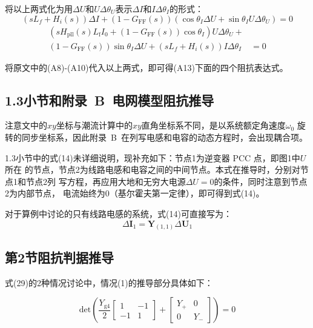 \documentclass[12pt, a4paper, UTF8, fontset=adobe, scheme=chinese, heading=true, oneside]{ctexbook} %
\begin{document}
将以上两式化为用$\Delta U$和$U\Delta\theta_U$表示$\Delta I$和$I\Delta\theta_I$的形式：
\begin{equation}
  (sL_f+H_i(s))\Delta I + (1-G_{\mathrm{FF}}(s))(\cos\theta_I\Delta U + \sin\theta_I U\Delta\theta_U) = 0
\end{equation}
\begin{equation}
\begin{split}
  \left(s H_{\mathrm{pll}}(s)L_{\mathrm{f}}I_0 + (1-G_{\mathrm{FF}}(s))\cos\theta_I \right) U \Delta \theta_U + & \\
  (1-G_{\mathrm{FF}}(s))\sin\theta_I\Delta U + (sL_f+H_i(s))I\Delta\theta_I &= 0 
\end{split}
\end{equation}

将原文中的(A8)-(A10)代入以上两式，即可得(A13)下面的四个阻抗表达式。

\subsection{1.3小节和附录~B~电网模型阻抗推导}
注意文中的$xy$坐标与潮流计算中的$xy$直角坐标系不同，是以系统额定角速度$\omega_0$
旋转的同步坐标系，因此附录~B~在列写电感和电容的动态方程时，会出现耦合项。

1.3小节中的式(14)未详细说明，现补充如下：节点1为逆变器 PCC 点，即图1中$U$所在
的节点，节点2为线路电感和电容之间的中间节点。本式在推导时，分别对节点1和节点2列
写方程，再应用大地和无穷大电源$\Delta U = 0$的条件，同时注意到节点2为内部节点，
电流始终为0（基尔霍夫第一定律），即可得到式(14)。

对于算例中讨论的只有线路电感的系统，式(14)可直接写为：
\begin{equation}
  \Delta \bm{I}_1 = \bm{Y}_{(1,1)} \Delta \bm{U}_1
\end{equation}

\subsection{第2节阻抗判据推导}

式(29)的2种情况讨论中，情况(1)的推导部分具体如下：

\begin{equation}
  \mathrm{det} \left( \frac{Y_{\mathrm{g4}}}{2}
    \begin{bmatrix}
      1 & -1 \\
      -1 & 1
    \end{bmatrix} +
    \begin{bmatrix}
      Y_{+} & 0 \\
      0 & Y_{-}
    \end{bmatrix}
  \right) = 0
\end{equation}
\end{document}
